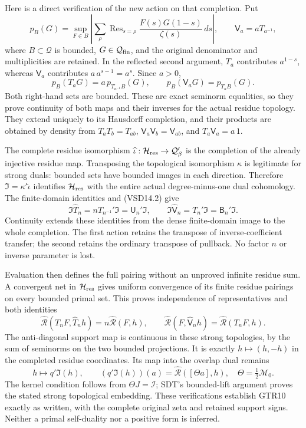 Here is a direct verification of the new action on that completion. Put
\[
p_B(G)=\sup_{F\in B}\left|
\sum_\rho\operatorname{Res}_{s=\rho}
\frac{F(s)G(1-s)}{\zeta(s)}\,ds\right|,
\qquad \mathsf V_a=aT_{a^{-1}},
\tag{VSD14.1}
\] where \(B\subset\mathcal Q\) is bounded,
\(G\in\mathcal Q_{\rm fin}\), and the original denominator and
multiplicities are retained. In the reflected second argument, \(T_a\)
contributes \(a^{1-s}\), whereas \(\mathsf V_a\) contributes
\(a\,a^{s-1}=a^s\). Since \(a>0\), \[
p_B(T_aG)=a\,p_{T_{a^{-1}}B}(G),\qquad
p_B(\mathsf V_aG)=p_{T_aB}(G).
\tag{VSD14.2}
\] Both right-hand sets are bounded. These are exact seminorm
equalities, so they prove continuity of both maps and their inverses for
the actual residue topology. They extend uniquely to its Hausdorff
completion, and their products are obtained by density from
\(T_aT_b=T_{ab}\), \(\mathsf V_a\mathsf V_b=\mathsf V_{ab}\), and
\(T_a\mathsf V_a=a\,1\).

The complete residue isomorphism
\(\widehat\iota:\mathcal H_{\rm res}\to\mathcal Q'_\beta\) is the
completion of the already injective residue map. Transposing the
topological isomorphism \(\kappa\) is legitimate for strong duals:
bounded sets have bounded images in each direction. Therefore
\(\mathfrak I=\kappa'\widehat\iota\) identifies \(\mathcal H_{\rm res}\)
with the entire actual degree-minus-one dual cohomology. The
finite-domain identities and (VSD14.2) give \[
\mathfrak I\widehat T_n
=nT_{n^{-1}}'\mathfrak I=\mathsf U_n'\mathfrak I,\qquad
\mathfrak I\widehat{\mathsf V}_n
=T_n'\mathfrak I=\mathsf B_n'\mathfrak I.
\tag{VSD14.3}
\] Continuity extends these identities from the dense finite-domain
image to the whole completion. The first action retains the transpose of
inverse-coefficient transfer; the second retains the ordinary transpose
of pullback. No factor \(n\) or inverse parameter is lost.

Evaluation then defines the full pairing without an unproved infinite
residue sum. A convergent net in \(\mathcal H_{\rm res}\) gives uniform
convergence of its finite residue pairings on every bounded primal set.
This proves independence of representatives and both identities \[
\widehat{\mathcal R}(T_nF,\widehat T_nh)
=n\widehat{\mathcal R}(F,h),\qquad
\widehat{\mathcal R}(F,\widehat{\mathsf V}_nh)
=\widehat{\mathcal R}(T_nF,h).
\tag{VSD14.4}
\] The anti-diagonal support map is continuous in these strong
topologies, by the sum of seminorms on the two bounded projections. It
is exactly \(h\mapsto(h,-h)\) in the completed residue coordinates. Its
map into the overlap dual remains \[
h\longmapsto q'\mathfrak I(h),\qquad
(q'\mathfrak I(h))(a)=\widehat{\mathcal R}([\Theta a],h),
\quad \Theta=\tfrac12\mathcal M_0.
\tag{VSD14.5}
\] The kernel condition follows from \(\Theta J=\mathcal I\); SDT's
bounded-lift argument proves the stated strong topological embedding.
These verifications establish GTR10 exactly as written, with the
complete original zeta and retained support signs. Neither a primal
self-duality nor a positive form is inferred.
